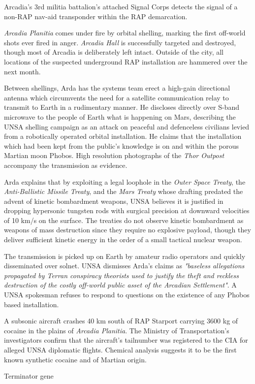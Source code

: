 Arcadia's 3rd militia battalion's attached Signal Corps detects the signal of a non-RAP nav-aid transponder within the RAP demarcation.
\StopTimelineDate

{\it Arcadia Planitia} comes under fire by orbital shelling, marking the first off-world shots ever fired in anger. {\it Arcadia Hall} is successfully targeted and destroyed, though most of Arcadia is deliberately left intact. Outside of the city, all locations of the suspected underground RAP installation are hammered over the next month.

Between shellings, Arda has the systems team erect a high-gain directional antenna which circumvents the need for a satellite communication relay to transmit to Earth in a rudimentary manner. He discloses directly over S-band microwave to the people of Earth what is happening on Mars, describing the UNSA shelling campaign as an attack on peaceful and defenceless civilians levied from a robotically operated orbital installation. He claims that the installation which had been kept from the public's knowledge is on and within the porous Martian moon Phobos. High resolution photographs of the {\it Thor Outpost} accompany the transmission as evidence.

Arda explains that by exploiting a legal loophole in the {\it Outer Space Treaty}, the {\it Anti-Ballistic Missile Treaty}, and the {\it Mars Treaty} whose drafting predated the advent of kinetic bombardment weapons, UNSA believes it is justified in dropping hypersonic tungsten rods with surgical precision at downward velocities of 10 km/s on the surface. The treaties do not observe kinetic bombardment as weapons of mass destruction since they require no explosive payload, though they deliver sufficient kinetic energy in the order of a small tactical nuclear weapon.

The transmission is picked up on Earth by amateur radio operators and quickly disseminated over solnet. UNSA dismisses Arda's claims as {\it "baseless allegations propagated by Terran conspiracy theorists used to justify the theft and reckless destruction of the costly off-world public asset of the Arcadian Settlement"}. A UNSA spokesman refuses to respond to questions on the existence of any Phobos based installation.
\StopTimelineDate

A subsonic aircraft crashes 40 km south of RAP Starport carrying 3600 kg of cocaine in the plains of {\it Arcadia Planitia}. The Ministry of Transportation's investigators confirm that the aircraft's tailnumber was registered to the CIA for alleged UNSA diplomatic flights. Chemical analysis suggests it to be the first known synthetic cocaine and of Martian origin.
\StopTimelineDate

Terminator gene

\stoplines

\StopChapter

